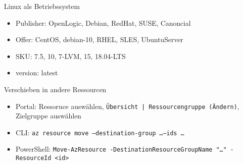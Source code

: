 \begin{flashcard}[Definition]{Linux als Betriebssystem}
    \begin{itemize}
        \item Publisher: OpenLogic, Debian, RedHat, SUSE, Canoncial
        \item Offer: CentOS, debian-10, RHEL, SLES, UbuntuServer
        \item SKU: 7.5, 10, 7-LVM, 15, 18.04-LTS
        \item version: latest
    \end{itemize}
\end{flashcard}

\begin{flashcard}[Definition]{Verschieben in andere Ressourcen}
    \begin{itemize}
        \item Portal:\newline
            Ressoruce auswählen, \texttt{Übersicht | Ressourcengruppe (Ändern)}, Zielgruppe auswählen
        \item CLI:\newline
            \texttt{az resource move --destination-group \ldots --ids \ldots}
        \item PowerShell:\newline
            \texttt{Move-AzResource\ -DestinationResourceGroupName "\ldots"\ -ResourceId <id>}
    \end{itemize}

\end{flashcard}
